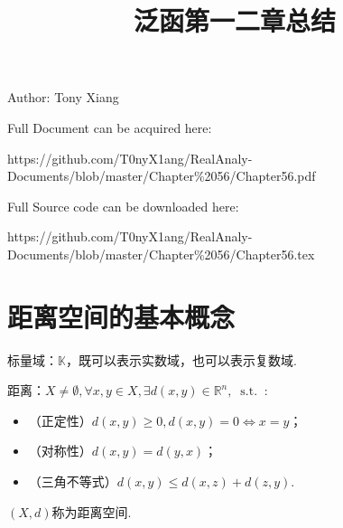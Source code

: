 \documentclass[bwprint, withoutpreface]{cumcmthesis}
\title{泛函第一二章总结}
\newcommand*{\st}{\mathop{}\!\mathrm{s.t.}\!\mathop{}}
\begin{document}
\maketitle
\noindent Author: Tony Xiang

\noindent Full Document can be acquired here: 

\noindent https://github.com/T0nyX1ang/RealAnaly-Documents/blob/master/Chapter\%2056/Chapter56.pdf

\noindent Full Source code can be downloaded here:

\noindent https://github.com/T0nyX1ang/RealAnaly-Documents/blob/master/Chapter\%2056/Chapter56.tex

\section{距离空间的基本概念}
标量域：$\mathbb{K}$，既可以表示实数域，也可以表示复数域.

距离：$X \neq \emptyset, \forall x, y \in X, \exists d(x, y) \in \mathbb{R}^n, \st:$
\begin{itemize}[itemindent=2em]
	\item （正定性）$d(x, y) \geqslant 0, d(x, y) = 0 \iff x = y$；
	\item （对称性）$d(x, y) = d(y, x)$；
	\item （三角不等式）$d(x, y) \leqslant d(x, z) + d(z, y)$.
\end{itemize}

$(X, d)$称为距离空间.
\end{document}
